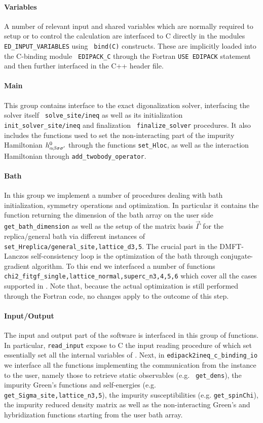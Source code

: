 \documentclass[edipack2.tex]{subfiles}
\begin{document}
\paragraph{{\bf Variables}}
A number of relevant input and shared variables which are normally
required to setup or to control the calculation are interfaced to C
directly in the \NAME modules {\tt ED\_INPUT\_VARIABLES} using {\tt
  bind(C)} constructs. These are implicitly loaded into the C-binding module {\tt
  EDIPACK\_C} through the Fortran {\tt USE EDIPACK} statement and
then further interfaced in the C++ header file. 


\paragraph{{\bf Main}} This group contains interface to the exact
digonalization solver, interfacing the solver itself {\tt
  solve\_site/ineq} as well as its initialization
{\tt init\_solver\_site/ineq} and finalization {\tt
  finalize\_solver} procedures. It also includes the functions used to
set the non-interacting part of the impurity Hamiltonian
$h^0_{\alpha\beta\sigma\sigma'}$ through the functions {\tt set\_Hloc}, as well as the
interaction Hamiltonian through {\tt add\_twobody\_operator}.


\paragraph{{\bf Bath}} In this group we implement a number of
procedures dealing with bath initialization, symmetry operations and
optimization. In particular it contains the function returning the
dimension of the bath array on the user side {\tt
  get\_bath\_dimension} as well as the setup of the matrix basis
$\vec{\Gamma}$ for the replica/general bath via different instances of
{\tt set\_Hreplica/general\_{site,lattice}\_d{3,5}}. 
The crucial part in the DMFT-Lanczos self-consistency loop is the optimization of the bath
through conjugate-gradient algorithm. To this end we interfaced a
number of functions {\tt
  chi2\_fitgf\_{single,lattice}\_{normal,superc}\_n{3,4,5,6}} which
cover all the cases supported in \NAME. Note that, because the actual
optimization is still performed through the Fortran code, no changes
apply to the outcome of this step.    

\paragraph{{\bf Input/Output}}
The input and output part of the software is interfaced in this group
of functions. In particular, {\tt read\_input} expose to C the input
reading procedure of \NAME which set essentially set all the internal
variables of \NAME.
Next, in {\tt edipack{2ineq}\_c\_binding\_io} we interface all the
functions implementing the communication from the \NAME instance to
the user, namely those to retrieve static observables (e.g. {\tt
  get\_dens}), the impurity Green's functions and self-energies
(e.g. {\tt get\_Sigma\_{site,lattice}\_n{3,5}}), the
impurity susceptibilities (e.g. {\tt get\_spinChi}), the impurity reduced density matrix as well
as the non-interacting Green's and hybridization functions starting from the
user bath array.   
\end{document}
